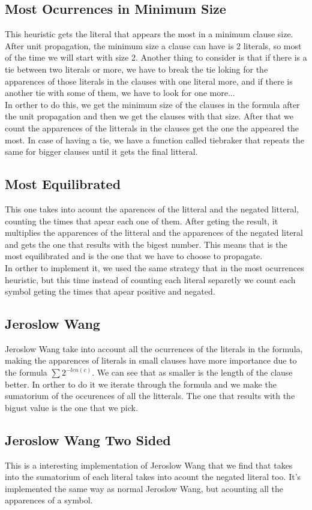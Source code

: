 \documentclass{article}
\begin{document}
\subsection{Most Ocurrences in Minimum Size}
This heuristic gets the literal that appears the most in a minimum clause size. After unit propagation, the minimum size a clause can have is 2 literals, so most of the time we will start with size 2. Another thing to consider is that if there is a tie between two literals or more, we have to break the tie loking for the apparences of those literals in the clauses with one literal more, and if there is another tie with some of them, we have to look for one more...\\
In orther to do this, we get the minimum size of the clauses in the formula after the unit propagation and then we get the clauses with that size. After that we count the apparences of the litterals in the clauses get the one the appeared the most. In case of having a tie, we have a function called tiebraker that repeats the same for bigger clauses until it gets the final litteral.
\subsection{Most Equilibrated}
This one takes into acount the aparences of the litteral and the negated litteral, counting the times that apear each one of them. After geting the result, it multiplies the apparences of the litteral and the apparences of the negated literal and gets the one that results with the bigest number. This means that is the most equilibrated and is the one that we have to choose to propagate.\\
In orther to implement it, we used the same strategy that in the most ocurrences heuristic, but this time  instead of counting each literal separetly we count each symbol geting the times that apear positive and negated.
\subsection{Jeroslow Wang}
%
Jeroslow Wang take into account all the ocurrences of the literals in the formula, making the apparences of literals in small clauses have more importance due to the formula  $\sum 2^{-len(c)}$. We can see that as smaller is the length of the clause better.
In orther to do it we iterate through the formula and we make the sumatorium of the occurences of all the litterals. The one that results with the bigust value is the one that we pick. 
\subsection{Jeroslow Wang Two Sided}
%
This is a interesting implementation of Jeroslow Wang that we find that takes into the sumatorium of each literal takes into acount the negated literal too. It's implemented the same way as normal Jeroslow Wang, but acounting all the apparences of a symbol.
\end{document}
